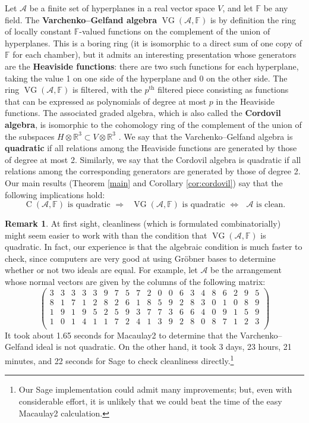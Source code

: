 \documentclass[11pt]{article}
\theoremstyle{definition}
\newtheorem{remark}[theorem]{Remark}
\newcommand{\R}{{\mathbb{R}}}
\newcommand{\F}{\mathbb{F}}
\newcommand{\<}{\left<}
\renewcommand{\>}{\right>}
\newcommand{\cA}{\mathcal{A}}
\newcommand{\VG}{\operatorname{VG}}
\newcommand{\Cor}{\operatorname{C}}
\begin{document}
Let $\cA$ be a finite set of hyperplanes in a real vector space $V$, and let $\F$ be any field.  The {\bf Varchenko--Gelfand algebra}
$\VG(\cA,\F)$ is by definition the ring of locally constant $\F$-valued functions on the complement of the union of hyperplanes.
This is a boring ring (it is isomorphic to a direct sum of one copy of $\F$ for each chamber), but it admits an interesting presentation
whose generators are the {\bf Heaviside functions}: there are two such functions for each hyperplane, taking the value 1 on one side
of the hyperplane and 0 on the other side.  The ring $\VG(\cA,\F)$ is filtered, with the $p^\text{th}$ filtered piece consisting as functions
that can be expressed as polynomials of degree at most $p$ in the Heaviside functions.  The associated graded algebra,
which is also called the {\bf Cordovil algebra},
is isomorphic to the cohomology ring of the complement of the union of the subspaces $H\otimes\R^3\subset V\otimes\R^3$ \cite{moseley,DBPW}.
We say that the Varchenko--Gelfand algebra is {\bf quadratic} if all relations among the Heaviside functions are generated by those of degree
at most 2.  Similarly, we say that the Cordovil algebra is quadratic if all relations among the corresponding generators are generated by those of
degree 2.  
Our main results (Theorem \ref{main} and Corollary \ref{cor:cordovil}) say that the following implications hold:
$$\text{$\Cor(\cA,\F)$ is quadratic $\Longrightarrow$ $\VG(\cA,\F)$ is quadratic $\Longleftrightarrow$ $\cA$ is clean.}$$

\begin{remark}\label{rem:speed}
At first sight, cleanliness (which is formulated combinatorially) might seem easier to work with than the condition that 
$\VG(\cA,\F)$ is quadratic.  In fact, our experience is that the algebraic condition is much faster to check, since computers are very good
at using Gr\"obner bases to determine whether or not two ideals are equal.
For example, let $\cA$ be the arrangement whose normal vectors are given by the columns of the following matrix:
\[
\left(
\begin{array}{cccccccccccccccccccc}
3 & 3 & 3 & 3 & 3 & 9 & 7 & 5 & 7 & 2 & 0 & 0 & 6 & 3 & 4 & 8 & 6 & 2 & 9 & 5 \\
8 & 1 & 7 & 1 & 2 & 8 & 2 & 6 & 1 & 8 & 5 & 9 & 2 & 8 & 3 & 0 & 1 & 0 & 8 & 9 \\
1 & 9 & 1 & 9 & 5 & 2 & 5 & 9 & 3 & 7 & 7 & 3 & 6 & 6 & 4 & 0 & 9 & 1 & 5 & 9 \\
1 & 0 & 1 & 4 & 1 & 1 & 7 & 2 & 4 & 1 & 3 & 9 & 2 & 8 & 0 & 8 & 7 & 1 & 2 & 3 \\
\end{array}
\right)
\]
It took about 1.65 seconds for Macaulay2 to determine that the Varchenko--Gelfand ideal is not quadratic.
On the other hand, it took 3 days, 23 hours, 21 minutes, and 22 seconds for Sage to check cleanliness directly.\footnote{Our 
Sage implementation could admit many improvements; but, even with considerable effort, it is unlikely that we could beat the time of the 
easy Macaulay2 calculation.}
\end{remark}
\end{document}
